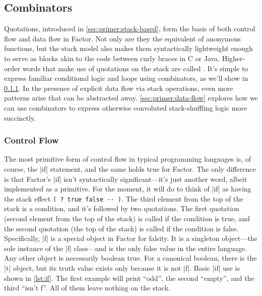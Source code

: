 \subsection{Combinators}\label{sec:primer:combinators}

Quotations, introduced in \cref{sec:primer:stack-based}, form the basis of both
control flow and data flow in Factor.  Not only are they the equivalent of
anonymous functions, but the stack model also makes them syntactically
lightweight enough to serve as blocks akin to the code between curly braces in
C or Java.  Higher-order words that make use of quotations on the stack are
called .  It's simple to express familiar conditional logic
and loops using combinators, as we'll show in \cref{sec:primer:control-flow}.
In the presence of explicit data flow via stack operations, even more patterns
arise that can be abstracted away.  \cref{sec:primer:data-flow} explores how we
can use combinators to express otherwise convoluted stack-shuffling logic more
succinctly.

\subsubsection{Control Flow}\label{sec:primer:control-flow}


The most primitive form of control flow in typical programming languages is, of
course, the |if| statement, and the same holds true for Factor.  The
only difference is that Factor's \factor|if| isn't syntactically
significant---it's just another word, albeit implemented as a primitive.  For
the moment, it will do to think of \factor|if| as having the stack effect
%
\Verb|( ? true false -- )|.
%
The third element from the top of the stack is a condition, and it's followed
by two quotations.  The first quotation (second element from the top of the
stack) is called if the condition is true, and the second quotation (the top of
the stack) is called if the condition is false.  Specifically, \factor|f| is a
special object in Factor for falsity.  It is a singleton object---the sole
instance of the \factor|f| class---and is the only false value in the entire
language.  Any other object is necessarily boolean true.  For a canonical
boolean, there is the \factor|t| object, but its truth value exists only
because it is not \factor|f|.  Basic \factor|if| use is shown in
\cref{lst:if}.  The first example will print ``odd'', the second
``empty'', and the third ``isn't f''.  All of them leave nothing on the stack.

